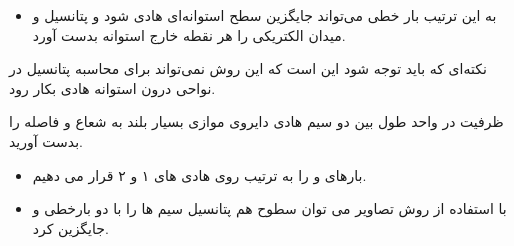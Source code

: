 \begin{ELjoin}

\begin{itemize}
\tightlist
\item
  به این ترتیب بار خطی \ELim{-\rho_\ell} می‌تواند جایگزین سطح استوانه‌ای هادی شود و پتانسیل و میدان الکتریکی را هر نقطه خارج استوانه بدست آورد.
\end{itemize}

\begin{ELremark}{}

نکته‌ای که باید توجه شود این است که این روش نمی‌تواند برای محاسبه پتانسیل در نواحی درون استوانه هادی بکار رود.

\end{ELremark}

\end{ELjoin}


\begin{ELexample}{}

ظرفیت در واحد طول بین دو سیم هادی دایروی موازی بسیار بلند به شعاع  و فاصله  را بدست آورید.


\begin{ELsolution}

\begin{itemize}
\tightlist
\item
  بارهای  و  را به ترتیب روی هادی های ۱ و ۲ قرار می دهیم.
\item
  با استفاده از روش تصاویر می توان سطوح هم پتانسیل سیم ها را با دو بارخطی \ELim{+\rho_\ell} و \ELim{-\rho_\ell} جایگزین کرد.
\end{itemize}


\begin{ELimportant}{}


\end{ELimportant}

\end{ELsolution}

\end{ELexample}

